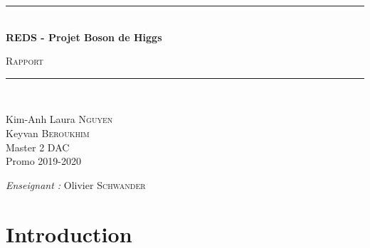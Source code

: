 \documentclass[12pt]{article}
\newcommand{\HRule}{\rule{\linewidth}{0.5mm}}
\begin{document}
\begin{titlepage}
  \begin{center}


    \vspace{4cm}
    \HRule \\[0.4cm]
    { \huge \bfseries REDS - Projet Boson de Higgs\\[0.4cm] }

      \textsc{\LARGE Rapport}\\[0.4cm]

    \HRule \\[0.4cm]

    \begin{minipage}{0.4\textwidth}
      \begin{flushleft} \large
        Kim-Anh Laura \textsc{Nguyen}\\
        Keyvan \textsc{Beroukhim} \\
        Master 2 DAC \\
        Promo 2019-2020 \\
      \end{flushleft}
    \end{minipage}
    \begin{minipage}{0.5\textwidth}
      \begin{flushright} \large
          \emph{Enseignant :} Olivier \textsc{Schwander} \\
      \end{flushright}
    \end{minipage}

      \vspace{2cm}


  \end{center}
\end{titlepage}

\newpage

\section{Introduction}
\end{document}
